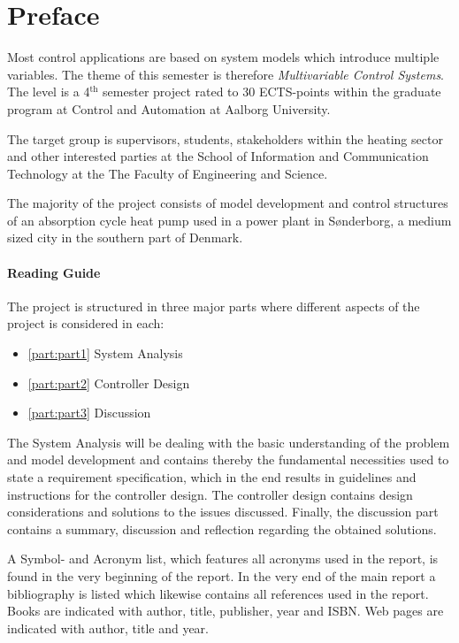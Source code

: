 \chapter*{Preface}
\vspace{-0.5cm}
Most control applications are based on system models which introduce multiple variables. The theme of this 
semester is therefore \textit{Multivariable Control Systems}. The level is a 4$^\text{th}$ semester project rated to 30 ECTS-points within the graduate program at Control and Automation at Aalborg University.

The target group is supervisors, students, stakeholders within the heating sector and other interested parties at the School of Information and Communication Technology at the The Faculty of Engineering and Science.

The majority of the project consists of model development and control structures of an absorption cycle heat pump used in a power plant in S\o nderborg, a medium sized city in the southern part of Denmark.
\subsubsection{Reading Guide}
The project is structured in three major parts where different aspects of the project is considered in each: 
\begin{itemize}
\item \ref{part:part1} System Analysis
\item \ref{part:part2} Controller Design
\item \ref{part:part3} Discussion 
\end{itemize}
\vspace{-0.2cm}
The System Analysis will be dealing with the basic understanding of the problem and model development and  contains thereby the fundamental necessities used to state a requirement specification, which in the end results in guidelines and instructions for the controller design. The controller design contains design considerations and solutions to the issues discussed. Finally, the discussion part contains a summary, discussion and reflection regarding the obtained solutions.

A Symbol- and Acronym list, which features all acronyms used in the report, is found in the very beginning of the report. In the very end of the main report a bibliography is listed which likewise contains all references used in the report. Books are indicated with author, title, publisher, year and ISBN. Web pages are indicated with author, title and year.

